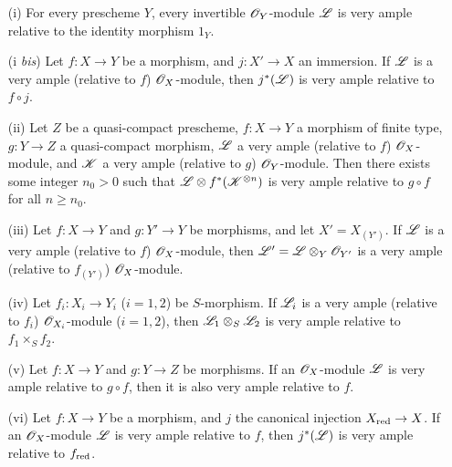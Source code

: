 \begin{proposition}[4.4.10]
\label{II.4.4.10}
\medskip\noindent
\begin{enumerate}
  \item[\rm{(i)}] For every prescheme $Y$, every invertible $\mathscr{O}_Y$-module $\mathscr{L}$ is very ample relative to the identity morphism $1_Y$.
  \item[\rm{(i \emph{bis})}] Let $f:X\to Y$ be a morphism, and $j:X'\to X$ an immersion.
    If $\mathscr{L}$ is a very ample (relative to $f$) $\mathscr{O}_X$-module, then $j^*(\mathscr{L})$ is very ample relative to $f\circ j$.
  \item[\rm{(ii)}] Let $Z$ be a quasi-compact prescheme, $f:X\to Y$ a morphism of finite type, $g:Y\to Z$ a quasi-compact morphism, $\mathscr{L}$ a very ample (relative to $f$) $\mathscr{O}_X$-module, and $\mathscr{K}$ a very ample (relative to $g$) $\mathscr{O}_Y$-module.
    Then there exists some integer $n_0>0$ such that $\mathscr{L}\otimes f^*(\mathscr{K}^{\otimes n})$ is very ample relative to $g\circ f$ for all $n\geq n_0$.
  \item[\rm{(iii)}] Let $f:X\to Y$ and $g:Y'\to Y$ be morphisms, and let $X'=X_{(Y')}$.
    If $\mathscr{L}$ is a very ample (relative to $f$) $\mathscr{O}_X$-module, then $\mathscr{L}'=\mathscr{L}\otimes_Y\mathscr{O}_{Y'}$ is a very ample (relative to $f_{(Y')}$) $\mathscr{O}_X$-module.
  \item[\rm{(iv)}] Let $f_i:X_i\to Y_i$ ($i=1,2$) be $S$-morphism.
    If $\mathscr{L}_i$ is a very ample (relative to $f_i$) $\mathscr{O}_{X_i}$-module ($i=1,2$), then $\mathscr{L}_1\otimes_S\mathscr{L}_2$ is very ample relative to $f_1\times_S f_2$.
  \item[\rm{(v)}] Let $f:X\to Y$ and $g:Y\to Z$ be morphisms.
    If an $\mathscr{O}_X$-module $\mathscr{L}$ is very ample relative to $g\circ f$, then it is also very ample relative to $f$.
  \item[\rm{(vi)}] Let $f:X\to Y$ be a morphism, and $j$ the canonical injection $X_\red\to X$.
    If an $\mathscr{O}_X$-module $\mathscr{L}$ is very ample relative to $f$, then $j^*(\mathscr{L})$ is very ample relative to $f_{\mathrm{red}}$.
\end{enumerate}
\end{proposition}

